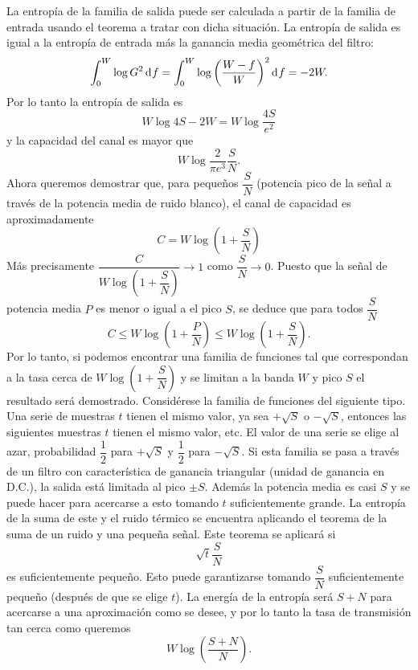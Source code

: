 La entrop\'ia de la familia de salida puede ser calculada a partir
de la familia de entrada usando el teorema a tratar con dicha
situaci\'on. La entrop\'ia de salida es igual a la entrop\'ia de
entrada m\'as la ganancia media geom\'etrica del filtro:
\begin{equation}
  \int_{0}^{W} \log G^2 \diff f = \int_{0}^{W} \log \left(
  \dfrac{W - f}{W} \right)^2 \diff f = -2W.
\end{equation}
Por lo tanto la entrop\'ia de salida es
\begin{equation}
  W \log 4S - 2W = W \log \dfrac{4S}{e^2}
\end{equation}
y la capacidad del canal es mayor que
\begin{equation}
  W \log \dfrac{2}{\pi e^3} \dfrac{S}{N}.
\end{equation}
Ahora queremos demostrar que, para peque\~nos $\dfrac{S}{N}$
(potencia pico de la se\~nal a trav\'es de la potencia media de
ruido blanco), el canal de capacidad es aproximadamente
\begin{equation}
  C = W \log \left(1 + \dfrac{S}{N} \right)
\end{equation}
M\'as precisamente
$\dfrac{C}{W \log \left(1 + \dfrac{S}{N} \right)} \to 1$ como
$\dfrac{S}{N} \to 0$. Puesto que la se\~nal de potencia media $P$ es
menor o igual a el pico $S$, se deduce que para todos $\dfrac{S}{N}$
\begin{equation}
  C \le W \log \left(1 + \dfrac{P}{N} \right)
  \le W \log \left(1 + \dfrac{S}{N} \right).
\end{equation}
Por lo tanto, si podemos encontrar una familia de funciones tal que
correspondan a la tasa cerca de
$W \log \left(1 + \dfrac{S}{N} \right)$ y se limitan a la banda $W$
y pico $S$ el resultado ser\'a demostrado. Consid\'erese la familia
de funciones del siguiente tipo. Una serie de muestras $t$ tienen el
mismo valor, ya sea $+\sqrt{S}$ o $-\sqrt{S}$, entonces las
siguientes muestras $t$ tienen el mismo valor, etc. El valor de una
serie se elige al azar, probabilidad $\dfrac{1}{2}$ para $+\sqrt{S}$
y $\dfrac{1}{2}$ para $-\sqrt{S}$. Si esta familia se pasa a trav\'es
de un filtro con caracter\'istica de ganancia triangular (unidad de
ganancia en D.C.), la salida est\'a limitada al pico $\pm S$.
Adem\'as la potencia media es casi $S$ y se puede hacer para
acercarse a esto tomando $t$ suficientemente grande. La entrop\'ia
de la suma de este y el ruido t\'ermico se encuentra aplicando el
teorema de la suma de un ruido y una peque\~na se\~nal. Este teorema
se aplicar\'a si
\begin{equation}
  \sqrt{t} \dfrac{S}{N}
\end{equation}
es suficientemente peque\~no. Esto puede garantizarse tomando
$\dfrac{S}{N}$ suficientemente peque\~no (despu\'es de que se elige
$t$). La energ\'ia de la entrop\'ia ser\'a $S + N$ para acercarse a
una aproximaci\'on como se desee, y por lo tanto la tasa de
transmisi\'on tan cerca como queremos
\begin{equation}
  W \log \left(\dfrac{S + N}{N} \right).
\end{equation}

\clearpage
